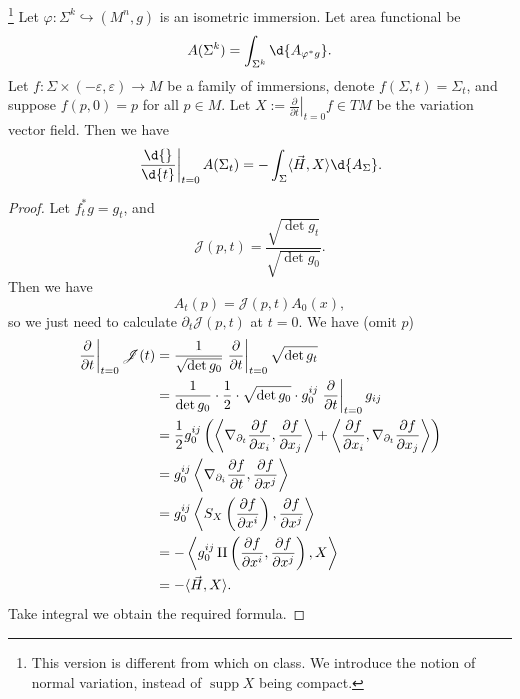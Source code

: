 \begin{prop}
    \footnote{This version is different from which on class. We introduce the notion of normal variation, instead of $\operatorname{supp}X$ being compact.}
    Let $\varphi:\Sigma^k\hookrightarrow(M^n,g)$ is an isometric immersion.
    Let area functional be
    \[A(\Sigma^k)=\int_{\Sigma^k}\d{A_{\varphi^*g}}.\]
    Let $f:\Sigma\times(-\varepsilon,\varepsilon)\to M$ be a family of immersions, denote $f(\Sigma,t)=\Sigma_t$, and suppose $f(p,0)=p$ for all $p\in M$.
    Let $X:=\left.\frac{\partial{}}{\partial{t}}\right|_{t=0}f\in TM$ be the variation vector field.
    Then we have
    \[\left.\frac{\d{}}{\d{t}}\right|_{t=0}A(\Sigma_t)=-\int_\Sigma\langle\vec{H},X\rangle\d{A_\Sigma}.\]
\end{prop}
\begin{proof}
    Let $f^*_tg=g_t$, and
    \[\mathscr{J}(p,t)=\frac{\sqrt{\det{g_t}}}{\sqrt{\det{g_0}}}.\]
    Then we have
    \[A_t(p)=\mathscr{J}(p,t)A_0(x),\]
    so we just need to calculate $\partial_t\mathscr{J}(p,t)$ at $t=0$.
    We have (omit $p$)
    \begin{align*}
        \left.\frac{\partial{}}{\partial{t}}\right|_{t=0}\mathscr{J}(t)&=\frac{1}{\sqrt{\det{g_0}}}\left.\frac{\partial}{\partial{t}}\right|_{t=0}\sqrt{\det{g_t}}\\
        &=\frac{1}{\det{g_0}}\cdot\frac{1}{2}\cdot\sqrt{\det{g_0}}\cdot g^{ij}_0\left.\frac{\partial{}}{\partial{t}}\right|_{t=0}g_{ij}\\
        &=\frac{1}{2}g_0^{ij}\left(\left\langle\nabla_{\partial_t}\frac{\partial{f}}{\partial{x_i}},\frac{\partial{f}}{\partial{x_j}}\right\rangle+\left\langle\frac{\partial{f}}{\partial{x_i}},\nabla_{\partial_t}\frac{\partial{f}}{\partial{x_j}}\right\rangle\right)\\
        &=g^{ij}_0\left\langle\nabla_{\partial_i}\frac{\partial{f}}{\partial{t}},\frac{\partial{f}}{\partial{x^j}}\right\rangle\\
        &=g^{ij}_0\left\langle S_{X}\left(\frac{\partial{f}}{\partial{x^i}}\right),\frac{\partial{f}}{\partial{x^j}}\right\rangle\\
        &=-\left\langle g^{ij}_0\operatorname{II}\left(\frac{\partial{f}}{\partial{x^i}},\frac{\partial{f}}{\partial{x^j}}\right),X\right\rangle\\
        &=-\langle \vec{H},X\rangle.
    \end{align*}
    Take integral we obtain the required formula.
\end{proof}

